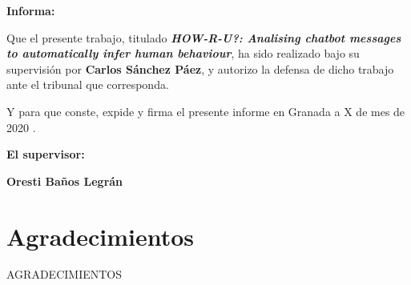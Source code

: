 \vspace{0.5cm}

\textbf{Informa:}

\vspace{0.5cm}

Que el presente trabajo, titulado \textit{\textbf{HOW-R-U?: Analising chatbot messages to automatically infer human behaviour}},
ha sido realizado bajo su supervisión por \textbf{Carlos Sánchez Páez}, y autorizo la defensa de dicho trabajo ante el tribunal
que corresponda.

\vspace{0.5cm}

Y para que conste, expide y firma el presente informe en Granada a X de mes de 2020 .

\vspace{1cm}

\textbf{El supervisor:}

\vspace{5cm}
\begin{center}
\textbf{Oresti Baños Legrán}

\end{center}


\newpage

\section*{Agradecimientos}
\thispagestyle{empty}

       \vspace{1cm}


AGRADECIMIENTOS
